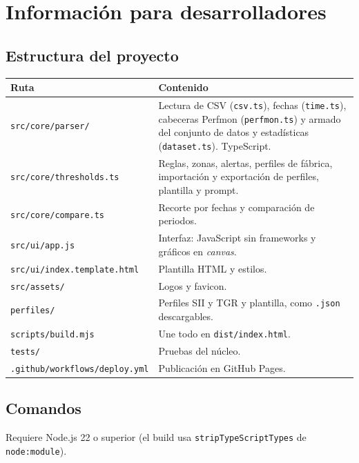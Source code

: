 \documentclass[11pt,a4paper,oneside]{report}
\begin{document}
\appendix

\chapter{Información para desarrolladores}

\section{Estructura del proyecto}

\begin{center}
\small
\begin{tabularx}{\textwidth}{lX}
  \toprule
  Ruta & Contenido \\
  \midrule
  \texttt{src/core/parser/} & Lectura de CSV (\texttt{csv.ts}), fechas
     (\texttt{time.ts}), cabeceras Perfmon (\texttt{perfmon.ts}) y armado del
     conjunto de datos y estadísticas (\texttt{dataset.ts}). TypeScript. \\
  \texttt{src/core/thresholds.ts} & Reglas, zonas, alertas, perfiles de
     fábrica, importación y exportación de perfiles, plantilla y prompt. \\
  \texttt{src/core/compare.ts} & Recorte por fechas y comparación de periodos. \\
  \texttt{src/ui/app.js} & Interfaz: JavaScript sin frameworks y gráficos en
     \emph{canvas}. \\
  \texttt{src/ui/index.template.html} & Plantilla HTML y estilos. \\
  \texttt{src/assets/} & Logos y favicon. \\
  \texttt{perfiles/} & Perfiles SII y TGR y plantilla, como \texttt{.json}
     descargables. \\
  \texttt{scripts/build.mjs} & Une todo en \texttt{dist/index.html}. \\
  \texttt{tests/} & Pruebas del núcleo. \\
  \texttt{.github/workflows/deploy.yml} & Publicación en GitHub Pages. \\
  \bottomrule
\end{tabularx}
\end{center}

\section{Comandos}

Requiere Node.js 22 o superior (el build usa
\texttt{stripTypeScriptTypes} de \texttt{node:module}).
\end{document}
